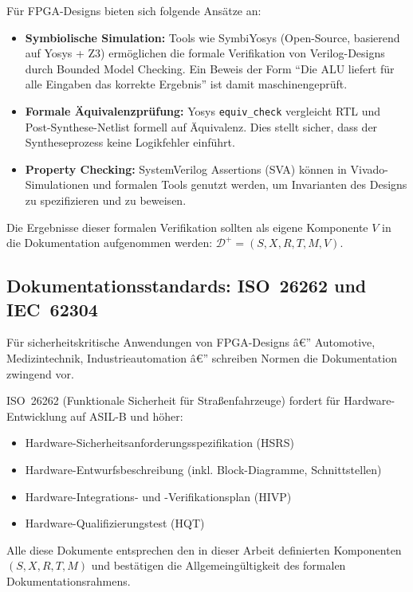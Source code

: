 ﻿\documentclass[a4paper,12pt]{article}
\theoremstyle{definition}
\begin{document}
Für FPGA-Designs bieten sich folgende Ansätze an:
\begin{itemize}
    \item \textbf{Symbio\-lische Simulation:} Tools wie SymbiYosys
          (Open-Source, basierend auf Yosys + Z3) ermöglichen die formale
          Verifikation von Verilog-Designs durch Bounded Model Checking.
          Ein Beweis der Form ``Die ALU liefert für alle Eingaben das
          korrekte Ergebnis'' ist damit maschinengeprüft.
    \item \textbf{Formale Äquivalenzprüfung:} Yosys \texttt{equiv\_check}
          vergleicht RTL und Post-Synthese-Netlist formell auf Äquivalenz.
          Dies stellt sicher, dass der Syntheseprozess keine Logikfehler
          einführt.
    \item \textbf{Property Checking:} SystemVerilog Assertions (SVA) können
          in Vivado-Simulationen und formalen Tools genutzt werden, um
          Invarianten des Designs zu spezifizieren und zu beweisen.
\end{itemize}

Die Ergebnisse dieser formalen Verifikation sollten als eigene Komponente
$V$ in die Dokumentation aufgenommen werden:
$\mathcal{D}^+ = (S, X, R, T, M, V)$.

\subsection{Dokumentationsstandards: ISO~26262 und IEC~62304}

Für sicherheitskritische Anwendungen von FPGA-Designs â€” Automotive, Medizintechnik,
Industrieautomation â€” schreiben Normen die Dokumentation zwingend vor.

ISO~26262 (Funktionale Sicherheit für Straßenfahrzeuge) fordert für
Hardware-Entwicklung auf ASIL-B und höher:
\begin{itemize}
    \item Hardware-Sicherheitsanforderungsspezifikation (HSRS)
    \item Hardware-Entwurfsbeschreibung (inkl. Block-Diagramme, Schnittstellen)
    \item Hardware-Integrations- und -Verifikationsplan (HIVP)
    \item Hardware-Qualifizierungstest (HQT)
\end{itemize}

Alle diese Dokumente entsprechen den in dieser Arbeit definierten Komponenten
$(S, X, R, T, M)$ und bestätigen die Allgemeingültigkeit des formalen
Dokumentationsrahmens.
\end{document}
